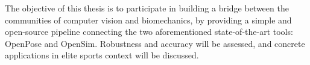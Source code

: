 The objective of this thesis is to participate in building a bridge between the communities of computer vision and biomechanics, by providing a simple and open-source pipeline connecting the two aforementioned state-of-the-art tools: OpenPose and OpenSim. Robustness and accuracy will be assessed, and concrete applications in elite sports context will be discussed. 











